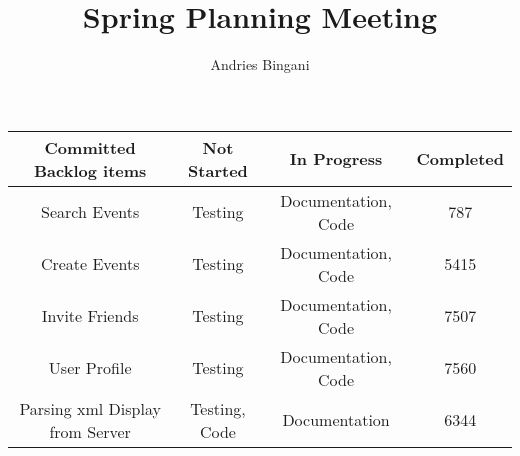 \documentclass[10pt,a4paper]{article}
\author{Andries Bingani}
\title{Spring Planning Meeting}
\begin{document}
\maketitle


\begin{center}
 \begin{tabular}{||c | c | c | c||} 
 \hline
Committed Backlog items & Not Started & In Progress & Completed \\ [0.5ex] 
 \hline\hline
 Search Events & Testing & Documentation,  Code & 787 \\ 
 \hline
 Create Events &  Testing &  Documentation, Code & 5415 \\
 \hline
 Invite Friends &  Testing &  Documentation, Code & 7507 \\
 \hline
 User Profile &  Testing &  Documentation, Code & 7560 \\
 \hline
Parsing xml Display from Server &  Testing, Code &  Documentation & 6344 \\ [1ex] 
 \hline
\end{tabular}
\end{center}
\end{document}
